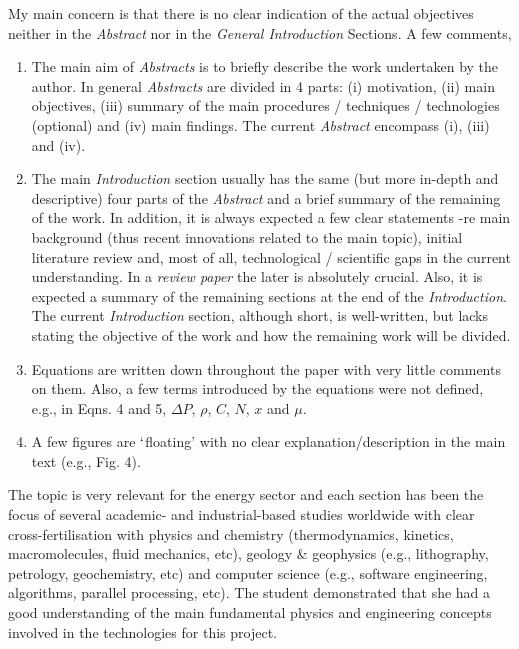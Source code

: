 \documentclass[14pt,twoside]{report}
\begin{document}
My main concern is that there is no clear indication of the actual objectives neither in the {\it Abstract} nor in the {\it General Introduction} Sections. A few comments,
\begin{enumerate}
%
\item The main aim of {\it Abstracts} is to briefly describe the work undertaken by the author. In general {\it Abstracts} are divided in 4 parts: (i) motivation, (ii) main objectives, (iii) summary of the main procedures / techniques / technologies (optional) and (iv) main findings. The current {\it Abstract} encompass (i), (iii) and (iv).
%
\item The main {\it Introduction} section usually has the same (but more in-depth and descriptive) four parts of the {\it Abstract} and a brief summary of the remaining of the work. In addition, it is always expected a few clear statements -re main background (thus recent innovations related to the main topic), initial literature review and, most of all, technological / scientific gaps in the current understanding. In a {\it review paper} the later is absolutely crucial. Also, it is expected a summary of the remaining sections at the end of the {\it Introduction}. The current {\it Introduction} section, although short, is well-written, but lacks stating the objective of the work and how the remaining work will be divided.
%
\item Equations are written down throughout the paper with very little comments on them. Also, a few terms introduced by the equations were not defined, e.g., in Eqns. 4 and 5, $\Delta P$, $\rho$, $C$, $N$, $x$ and $\mu$.
%
\item A few figures are $\lq$floating' with no clear explanation/description in the main text (e.g., Fig. 4).   
% 
\end{enumerate}

The topic is very relevant for the energy sector and each section has been the focus of several academic- and industrial-based studies worldwide with clear cross-fertilisation with physics and chemistry (thermodynamics, kinetics, macromolecules, fluid mechanics, etc), geology $\&$ geophysics (e.g., lithography, petrology, geochemistry, etc) and computer science (e.g., software engineering, algorithms, parallel processing, etc).  The student demonstrated that she had a good understanding of the main fundamental physics and engineering concepts involved in the technologies for this project.

\clearpage
\end{document}
